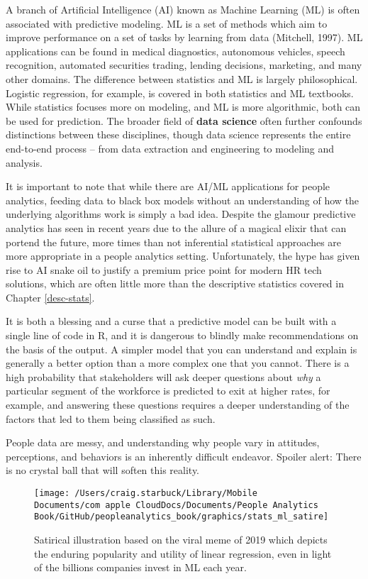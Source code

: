 \documentclass[
]{book}
\begin{document}
A branch of Artificial Intelligence (AI) known as Machine Learning (ML) is often associated with predictive modeling. ML is a set of methods which aim to improve performance on a set of tasks by learning from data (Mitchell, 1997). ML applications can be found in medical diagnostics, autonomous vehicles, speech recognition, automated securities trading, lending decisions, marketing, and many other domains. The difference between statistics and ML is largely philosophical. Logistic regression, for example, is covered in both statistics and ML textbooks. While statistics focuses more on modeling, and ML is more algorithmic, both can be used for prediction. The broader field of \textbf{data science} often further confounds distinctions between these disciplines, though data science represents the entire end-to-end process -- from data extraction and engineering to modeling and analysis.

It is important to note that while there are AI/ML applications for people analytics, feeding data to black box models without an understanding of how the underlying algorithms work is simply a bad idea. Despite the glamour predictive analytics has seen in recent years due to the allure of a magical elixir that can portend the future, more times than not inferential statistical approaches are more appropriate in a people analytics setting. Unfortunately, the hype has given rise to AI snake oil to justify a premium price point for modern HR tech solutions, which are often little more than the descriptive statistics covered in Chapter \ref{desc-stats}.

It is both a blessing and a curse that a predictive model can be built with a single line of code in R, and it is dangerous to blindly make recommendations on the basis of the output. A simpler model that you can understand and explain is generally a better option than a more complex one that you cannot. There is a high probability that stakeholders will ask deeper questions about \emph{why} a particular segment of the workforce is predicted to exit at higher rates, for example, and answering these questions requires a deeper understanding of the factors that led to them being classified as such.

People data are messy, and understanding why people vary in attitudes, perceptions, and behaviors is an inherently difficult endeavor. Spoiler alert: There is no crystal ball that will soften this reality.

\begin{figure}

{\centering \texttt{[image: /Users/craig.starbuck/Library/Mobile Documents/com~apple~CloudDocs/Documents/People Analytics Book/GitHub/peopleanalytics\_book/graphics/stats\_ml\_satire]} 

}

\caption{Satirical illustration based on the viral meme of 2019 which depicts the enduring popularity and utility of linear regression, even in light of the billions companies invest in ML each year.}\label{fig:stats-ml-satire}
\end{figure}
\end{document}
